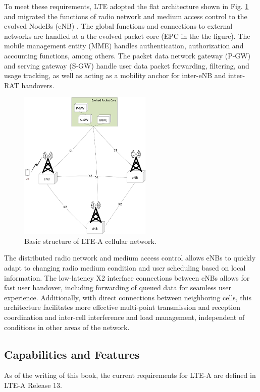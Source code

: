 To meet these requirements, LTE adopted the flat architecture shown in Fig. \ref{figs:LTE-A-Network} and migrated the functions of radio network and medium access control to the evolved NodeBs (eNB) \cite{lte-3gpp}.  The global functions and connections to external networks are handled at a the evolved packet core (EPC in the the figure). The mobile management entity (MME) handles authentication, authorization and accounting functions, among others.  The packet data network gateway (P-GW) and serving gateway (S-GW) handle user data packet forwarding, filtering, and usage tracking, as well as acting as a mobility anchor for inter-eNB and inter-RAT handovers.
\begin{figure}[!ht]
	\centering
	\includegraphics[width=2.5in]{figures3/lteAnet}
	\caption{Basic structure of LTE-A cellular network.}
	\label{figs:LTE-A-Network}
\end{figure}

The distributed radio network and medium access control allows eNBs to quickly adapt to changing radio medium condition and user scheduling based on local information.  The low-latency X2 interface connections between eNBs allows for fast user handover, including forwarding of queued data for seamless user experience.  Additionally, with direct connections between neighboring cells, this architecture facilitates more effective multi-point transmission and reception coordination and inter-cell interference and load management, independent of conditions in other areas of the network.  

\subsection{Capabilities and Features}
\label{cap-feat}
As of the writing of this book, the current requirements for LTE-A are defined in LTE-A Release 13.  

